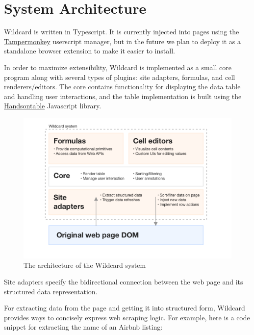 \documentclass[english,submission]{programming}
\begin{document}
\hypertarget{system-architecture}{%
\section{System Architecture}\label{system-architecture}}

Wildcard is written in Typescript. It is currently injected into pages
using the \href{https://www.tampermonkey.net/}{Tampermonkey} userscript
manager, but in the future we plan to deploy it as a standalone browser
extension to make it easier to install.

In order to maximize extensibility, Wildcard is implemented as a small
core program along with several types of plugins: site adapters,
formulas, and cell renderers/editors. The core contains functionality
for displaying the data table and handling user interactions, and the
table implementation is built using the
\href{https://handsontable.com/}{Handsontable} Javascript library.

\begin{figure}
\hypertarget{fig:architecture}{%
\centering
\includegraphics{media/architecture-clean.png}
\caption{The architecture of the Wildcard
system}\label{fig:architecture}
}
\end{figure}

Site adapters specify the bidirectional connection between the web page
and its structured data representation.

For extracting data from the page and getting it into structured form,
Wildcard provides ways to concisely express web scraping logic. For
example, here is a code snippet for extracting the name of an Airbnb
listing:
\end{document}
